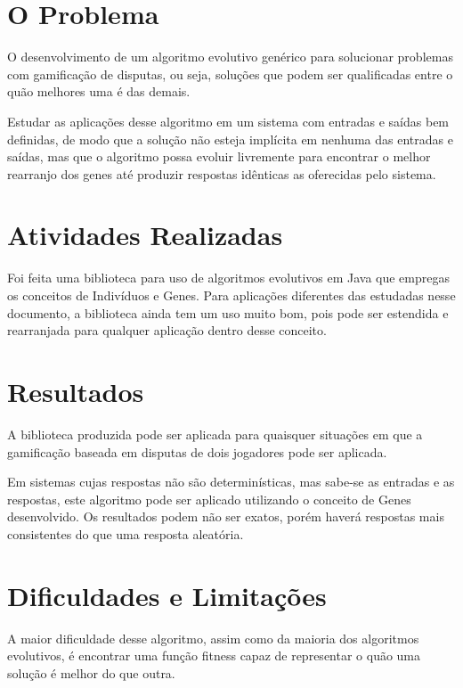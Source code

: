 \section{O Problema}

O desenvolvimento de um algoritmo evolutivo genérico para solucionar problemas com gamificação de disputas, ou seja, soluções que podem ser qualificadas entre o quão melhores uma é das demais.

Estudar as aplicações desse algoritmo em um sistema com entradas e saídas bem definidas, de modo que a solução não esteja implícita em nenhuma das entradas e saídas, mas que o algoritmo possa evoluir livremente para encontrar o melhor rearranjo dos genes até produzir respostas idênticas as oferecidas pelo sistema.

\section{Atividades Realizadas}

Foi feita uma biblioteca para uso de algoritmos evolutivos em Java que empregas os conceitos de Indivíduos e Genes. Para aplicações diferentes das estudadas nesse documento, a biblioteca ainda tem um uso muito bom, pois pode ser estendida e rearranjada para qualquer aplicação dentro desse conceito.

\section{Resultados}

A biblioteca produzida pode ser aplicada para quaisquer situações em que a gamificação baseada em disputas de dois jogadores pode ser aplicada.

Em sistemas cujas respostas não são determinísticas, mas sabe-se as entradas e as respostas, este algoritmo pode ser aplicado utilizando o conceito de Genes desenvolvido. Os resultados podem não ser exatos, porém haverá respostas mais consistentes do que uma resposta aleatória.

\section{Dificuldades e Limitações}

A maior dificuldade desse algoritmo, assim como da maioria dos algoritmos evolutivos, é encontrar uma função fitness capaz de representar o quão uma solução é melhor do que outra.